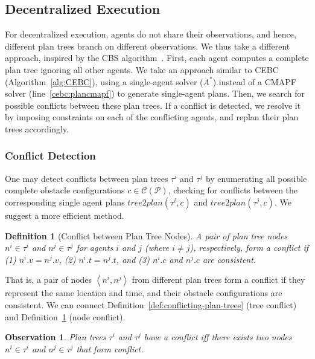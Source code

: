 \documentclass[letterpaper]{article} %
\newcommand{\toplan}{\textit{tree2plan}}
\newcommand{\tuple}[1]{\ensuremath{\left \langle #1 \right \rangle }}
\newcommand{\roni}[1]{{\textcolor{green}{[Roni: #1]}}}
\newtheorem{observation}{Observation}
\newtheorem{definition}{Definition}
\begin{document}
\subsection{Decentralized Execution}
\label{scn:decentralized}

For decentralized execution, agents do not share their observations, and hence, different plan trees branch on different observations.
We thus take a different approach, inspired by the CBS algorithm~\cite{sharon2015conflict}.
First, each agent computes a complete plan tree ignoring all other agents. We take an approach similar to CEBC (Algorithm~\ref{alg:CEBC}), using a single-agent solver ($A^*$) instead of a CMAPF solver (line~\ref{cebc:plancmapf}) to generate single-agent plans.
Then, we search for possible conflicts between these plan trees.
If a conflict is detected, we resolve it by imposing
constraints on each of the conflicting agents, and replan their plan trees accordingly.


\subsubsection{Conflict Detection}
\label{scn:conflicts}
One may detect conflicts between plan trees $\tau^i$ and $\tau^j$ by enumerating all possible complete obstacle configurations $c\in\mathcal{C}(\mathcal{P})$, checking for conflicts between the corresponding single agent plans $\toplan(\tau^i,c)$ and $\toplan(\tau^j,c)$.
We suggest a more efficient method.
\begin{definition}[Conflict between Plan Tree Nodes]
A pair of plan tree nodes $n^i\in\tau^i$ and $n^j\in\tau^j$ for agents $i$ and $j$ (where $i\neq j$), respectively, form a conflict if
(1) $n^i.v = n^j.v$,
(2) $n^i.t = n^j.t$,
and (3) $n^i.c$ and $n^j.c$ are consistent.
\label{def:mapfou-conflict}
\end{definition}
That is, a pair of nodes $\tuple{n^i,n^j}$ from different plan trees form a conflict if they represent the same location and time, and their obstacle configurations are consistent.
We can connect Definition~\ref{def:conflicting-plan-trees} (tree conflict) and  Definition~\ref{def:mapfou-conflict} (node conflict).
\begin{observation}
Plan trees $\tau^i$ and $\tau^j$ have a conflict
iff there exists two nodes $n^i\in\tau^i$ and $n^j\in\tau^j$ that form conflict.
\label{obs:conditionsForConflicts}
\end{observation}
\end{document}
